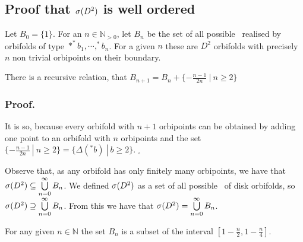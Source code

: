 \subsection{Proof that ${{\sigma}(D^2)}$ is well ordered}

\begin{definition} 
Let $B_0 = \{1\}$.
For an $n \in \mathbb{N}_{>0}$, let $B_n$ be the set of all possible \Eoc\ realised 
by orbifolds of type 
$*^*b_1, \cdots, ^*b_n$. For a given $n$ these are 
$D^2$ orbifolds with precisely $n$ non trivial orbipoints on their boundary.
\end{definition}


\begin{observation}\label{recursive_relation}
There is a recursive relation, that $B_{n+1}=B_n+\{-\frac{n-1}{2n}\ |\ n\geq 2\}$
\end{observation}
\subsubsection{Proof.}
It is so, because every orbifold with $n+1$ orbipoints can be obtained by adding one point 
to an orbifold with $n$ orbipoints and the set 
$\{-\frac{n-1}{2n}\ |\ n\geq 2\} = \{\Delta(^\ast b)\ |\ b \geq 2\}$. $_\square$


\begin{observation}\label{form_of_a_spectrum}
Observe that, as any orbifold has only finitely many orbipoints, we have that ${{\sigma}(D^2)} \subseteq 
\bigcup\limits^\infty_{n=0}B_n $. We defined ${{\sigma}(D^2)}$ as a set of all possible \Eoc\ of disk 
orbifolds, so ${{\sigma}(D^2)} \supseteq 
\bigcup\limits^\infty_{n=0}B_n $. From this we have that ${{\sigma}(D^2)} = \bigcup\limits^\infty_{n=0}B_n$.
\end{observation}

\begin{lemma}\label{fixed_number_of_orbipoints}
For any given $n \in \mathbb{N}$ the set $B_n$ is a subset of the interval 
$[1-\frac{n}{2}, 1-\frac{n}{4}]$.
\end{lemma}

